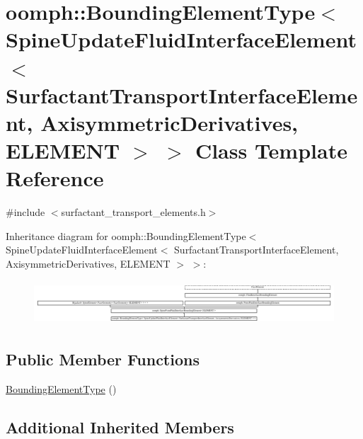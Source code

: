 \hypertarget{classoomph_1_1BoundingElementType_3_01SpineUpdateFluidInterfaceElement_3_01SurfactantTransportIn96bc27501b38520de44b2adcd1d39239}{}\section{oomph\+:\+:Bounding\+Element\+Type$<$ Spine\+Update\+Fluid\+Interface\+Element$<$ Surfactant\+Transport\+Interface\+Element, Axisymmetric\+Derivatives, E\+L\+E\+M\+E\+NT $>$ $>$ Class Template Reference}
\label{classoomph_1_1BoundingElementType_3_01SpineUpdateFluidInterfaceElement_3_01SurfactantTransportIn96bc27501b38520de44b2adcd1d39239}


{\ttfamily \#include $<$surfactant\+\_\+transport\+\_\+elements.\+h$>$}

Inheritance diagram for oomph\+:\+:Bounding\+Element\+Type$<$ Spine\+Update\+Fluid\+Interface\+Element$<$ Surfactant\+Transport\+Interface\+Element, Axisymmetric\+Derivatives, E\+L\+E\+M\+E\+NT $>$ $>$\+:\begin{figure}[H]
\begin{center}
\leavevmode
\includegraphics[height=1.648999cm]{classoomph_1_1BoundingElementType_3_01SpineUpdateFluidInterfaceElement_3_01SurfactantTransportIn96bc27501b38520de44b2adcd1d39239}
\end{center}
\end{figure}
\subsection*{Public Member Functions}
\begin{DoxyCompactItemize}
\item 
\hyperlink{classoomph_1_1BoundingElementType_3_01SpineUpdateFluidInterfaceElement_3_01SurfactantTransportIn96bc27501b38520de44b2adcd1d39239_ac2e8a92c0183f1ef76c05e1a20e45ba0}{Bounding\+Element\+Type} ()
\end{DoxyCompactItemize}
\subsection*{Additional Inherited Members}


